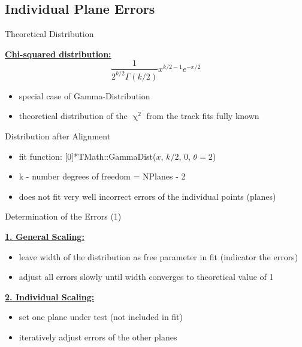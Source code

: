 \subsection{Individual Plane Errors}
\begin{frame}{Theoretical Distribution}

	\textbf{\underline{Chi-squared distribution:}}
	\begin{equation*}
		\frac{1}{2^{k/2}\Gamma\left(k/2\right)}x^{k/2-1}e^{-x/2}
	\end{equation*}
	

	\begin{itemize}\itemfill
		\item special case of Gamma-Distribution %
		\item theoretical distribution of the $\upchi^2$ from the track fits fully known
	\end{itemize}
	
\end{frame}
\begin{frame}{Distribution after Alignment}

	
	\begin{itemize}\itemfill
		\item fit function: [0]*TMath::GammaDist($x$, $k/2$, 0, $\theta = 2$)
		\item k - number degrees of freedom = NPlanes - 2
		\item does not fit very well \ra incorrect errors of the individual points (planes)
	\end{itemize}
	
\end{frame}
\begin{frame}{Determination of the Errors (1)}
	
	\textbf{\underline{1. General Scaling:}}\vspace*{1pt}
		\begin{itemize}\itemfill
			\item leave width of the distribution as free parameter in fit (indicator the errors)
			\item adjust all errors slowly until width converges to theoretical value of 1
		\end{itemize}\vspace*{1ex}
	\textbf{\underline{2. Individual Scaling:}}\vspace*{1pt}
	\begin{itemize}\itemfill
		\item set one plane under test (not included in fit)
		\item iteratively adjust errors of the other planes
	\end{itemize}
	\vspace*{-10pt}
	
\end{frame}
